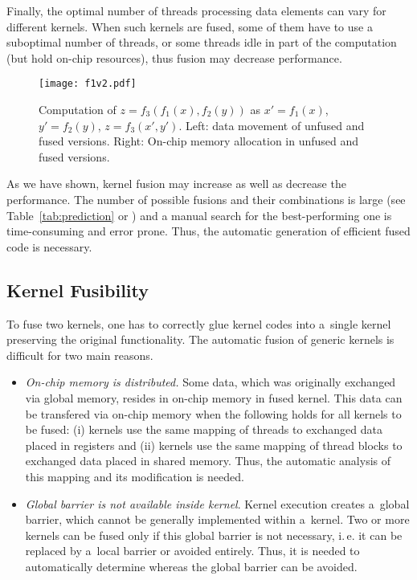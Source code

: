 \documentclass[final]{siamltex}
\def\ie{i.\,e.}
\begin{document}
Finally, the optimal number of threads processing data elements can vary for different kernels. When such kernels are fused, some of them have to use a suboptimal number of threads, or some threads idle in part of the computation (but hold on-chip resources), thus fusion may decrease performance.

\begin{figure}[t]
\centering
\texttt{[image: f1v2.pdf]}
\caption{Computation of $z = f_3(f_1(x), f_2(y))$ as $x'=f_1(x)$, $y'=f_2(y)$, $z = f_3(x',y')$. Left: data movement of unfused and fused versions. Right: On-chip memory allocation in unfused and fused versions.}
\label{fig:fusion-ilustration}
\end{figure}

As we have shown, kernel fusion may increase as well as decrease the performance. The number of possible fusions and their combinations is large (see Table~\ref{tab:prediction} or \cite{filipovic2012automatically}) and a manual search for the best-performing one is time-consuming and error prone. Thus, the automatic generation of efficient fused code is necessary.

\subsection{Kernel Fusibility}
\label{subsect:kerfus}

To fuse two kernels, one has to correctly glue kernel codes into a~single kernel preserving the original functionality. The automatic fusion of generic kernels is difficult for two main reasons.
\begin{itemize}
        \item \textit{On-chip memory is distributed.} Some data, which was originally exchanged via global memory, resides in on-chip memory in fused kernel. This data can be transfered via on-chip memory when the following holds for all kernels to be fused: (i) kernels use the same mapping of threads to exchanged data placed in registers and (ii) kernels use the same mapping of thread blocks to exchanged data placed in shared memory. Thus, the automatic analysis of this mapping and its modification is needed.\item \textit{Global barrier is not available inside kernel}. Kernel execution creates a~global barrier, which cannot be generally implemented within a~kernel. Two or more kernels can be fused only if this global barrier is not necessary, \ie{} it can be replaced by a~local barrier or avoided entirely. Thus, it is needed to automatically determine whereas the global barrier can be avoided.\end{itemize}
\end{document}
